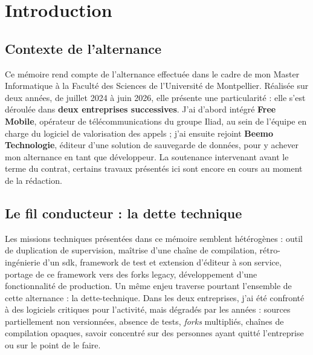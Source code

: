 \chapter{Introduction}
\label{chap:intro}


\section{Contexte de l'alternance}
Ce mémoire rend compte de l'alternance effectuée dans le cadre de mon Master
Informatique à la Faculté des Sciences de l'Université de Montpellier.
Réalisée sur deux années, de juillet 2024 à juin 2026, elle présente
une particularité : elle s'est déroulée dans \textbf{deux entreprises
successives}. J'ai d'abord intégré \textbf{Free Mobile}, opérateur de
télécommunications du groupe Iliad, au sein de l'équipe en charge du logiciel
de valorisation des appels ; j'ai ensuite rejoint \textbf{Beemo Technologie},
éditeur d'une solution de sauvegarde de données, pour y achever mon
alternance en tant que développeur. La soutenance intervenant avant le terme
du contrat, certains travaux présentés ici sont encore en cours au moment de
la rédaction.

\section{Le fil conducteur : la dette technique}
Les missions techniques présentées dans ce mémoire semblent hétérogènes :
outil de duplication de supervision, maîtrise d'une chaîne de compilation,
rétro-ingénierie d'un \gls{sdk}, framework de test et extension d'éditeur à
son service, portage de ce framework vers des forks legacy, développement
d'une fonctionnalité de production. Un même enjeu traverse
pourtant l'ensemble de cette alternance : la \gls{dette-technique}. Dans les
deux entreprises, j'ai été confronté à des logiciels critiques pour
l'activité, mais dégradés par les années : sources partiellement non
versionnées, absence de tests, \emph{forks} multipliés, chaînes de
compilation opaques, savoir concentré sur des personnes ayant quitté
l'entreprise ou sur le point de le faire.

